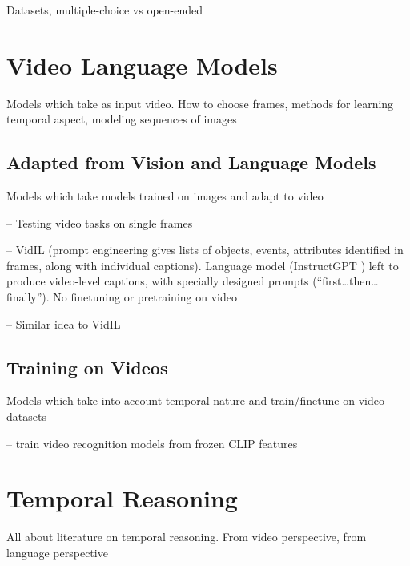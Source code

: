Datasets, multiple-choice vs open-ended

\section{Video Language Models}
\label{sec:vidlm}

Models which take as input video. How to choose frames, methods for learning
temporal aspect, modeling sequences of images

\subsection{Adapted from Vision and Language Models}
\label{sec:adaptvlm}

Models which take models trained on images and adapt to video

\cite{buch2022revisiting} -- Testing video tasks on single frames

\cite{wang2022vidil} -- VidIL (prompt engineering gives lists of objects,
events, attributes identified in frames, along with individual captions).
Language model (InstructGPT \cite{ouyang2022instructgpt}) left to produce
video-level captions, with specially designed prompts (``first\ldots then\ldots
finally''). No finetuning or pretraining on video

\cite{zeng2023socratic} -- Similar idea to VidIL

\subsection{Training on Videos}
\label{sec:vidtrain}

Models which take into account temporal nature and train/finetune on video datasets

\cite{lin2022evl} -- train video recognition models from frozen CLIP features

\section{Temporal Reasoning}
\label{sec:tempreason}

All about literature on temporal reasoning. From video perspective, from
language perspective

\cite{allen1983interval}
\cite{bruce1972temporalqa}
\cite{zhou2021tracie}

%
%
%
%
